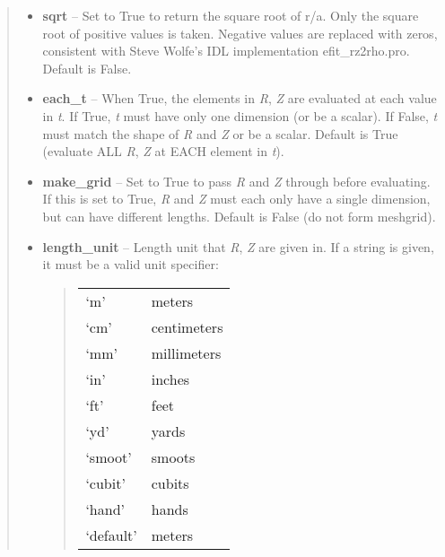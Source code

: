 \documentclass[letterpaper,10pt,english]{sphinxmanual}
\begin{document}
\begin{fulllineitems}
\begin{fulllineitems}
\begin{quote}
\begin{description}
\begin{itemize}
\item {} 
\textbf{sqrt} -- Set to True to return the square root of r/a.
Only the square root of positive values is taken. Negative
values are replaced with zeros, consistent with Steve Wolfe's
IDL implementation efit\_rz2rho.pro. Default is False.

\item {} 
\textbf{each\_t} -- When True, the elements in \emph{R}, \emph{Z} are evaluated
at each value in \emph{t}. If True, \emph{t} must have only one dimension
(or be a scalar). If False, \emph{t} must match the shape of \emph{R} and
\emph{Z} or be a scalar. Default is True (evaluate ALL \emph{R}, \emph{Z} at
EACH element in \emph{t}).

\item {} 
\textbf{make\_grid} -- Set to True to pass \emph{R} and \emph{Z} through
 before evaluating. If this is set to
True, \emph{R} and \emph{Z} must each only have a single dimension, but
can have different lengths. Default is False (do not form
meshgrid).

\item {} 
\textbf{length\_unit} -- 
Length unit that \emph{R}, \emph{Z} are given in.
If a string is given, it must be a valid unit specifier:
\begin{quote}

\begin{tabulary}{\linewidth}{|L|L|}
\hline

`m'
 & 
meters
\\

`cm'
 & 
centimeters
\\

`mm'
 & 
millimeters
\\

`in'
 & 
inches
\\

`ft'
 & 
feet
\\

`yd'
 & 
yards
\\

`smoot'
 & 
smoots
\\

`cubit'
 & 
cubits
\\

`hand'
 & 
hands
\\

`default'
 & 
meters
\\
\hline\end{tabulary}


\end{quote}
\end{itemize}
\end{description}
\end{quote}
\end{fulllineitems}
\end{fulllineitems}
\end{document}
